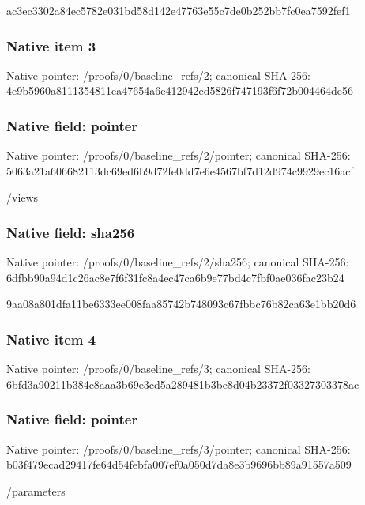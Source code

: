 \documentclass[10pt,a4paper]{article}
\begin{document}
\begingroup\raggedright\sloppy ac3ec3302a84ec5782e031bd58d142e47763e55c7de0b252bb7fc0ea7592fef1\par\endgroup

\subsubsection{Native item 3}
Native pointer: /proofs/0/baseline\_\allowbreak{}refs/2; canonical SHA-256: 4e9b5960a8111354811ea47654a6e412942ed5826f747193f6f72b004464de56

\subsubsection{Native field: pointer}
Native pointer: /proofs/0/baseline\_\allowbreak{}refs/2/pointer; canonical SHA-256: 5063a21a606682113dc69ed6b9d72fe0dd7e6e4567bf7d12d974c9929ec16acf

\begingroup\raggedright\sloppy /\allowbreak{}views\par\endgroup

\subsubsection{Native field: sha256}
Native pointer: /proofs/0/baseline\_\allowbreak{}refs/2/sha256; canonical SHA-256: 6dfbb90a94d1c26ac8e7f6f31fc8a4ec47ca6b9e77bd4c7fbf0ae036fac23b24

\begingroup\raggedright\sloppy 9aa08a801dfa11be6333ee008faa85742b748093c67fbbc76b82ca63e1bb20d6\par\endgroup

\subsubsection{Native item 4}
Native pointer: /proofs/0/baseline\_\allowbreak{}refs/3; canonical SHA-256: 6bfd3a90211b384c8aaa3b69e3cd5a289481b3be8d04b23372f03327303378ac

\subsubsection{Native field: pointer}
Native pointer: /proofs/0/baseline\_\allowbreak{}refs/3/pointer; canonical SHA-256: b03f479ecad29417fe64d54febfa007ef0a050d7da8e3b9696bb89a91557a509

\begingroup\raggedright\sloppy /\allowbreak{}parameters\par\endgroup
\end{document}
